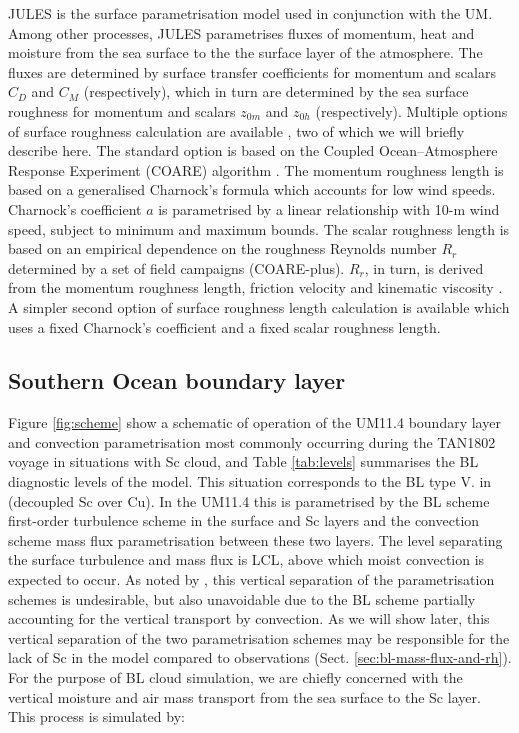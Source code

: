 JULES is the surface parametrisation model used in conjunction with the UM.
Among other processes, JULES parametrises fluxes of momentum, heat and moisture from
the sea surface to the the surface layer of the atmosphere. The fluxes are
determined by surface transfer coefficients for momentum and scalars $C_D$ and
$C_M$ (respectively), which in turn are determined by the sea surface roughness
for momentum and scalars $z_{0m}$ and $z_{0h}$ (respectively). Multiple options
of surface roughness calculation are available \citep{umdp024}, two of which we will briefly
describe here. The standard option is based on the
Coupled Ocean--Atmosphere Response Experiment (COARE) algorithm
\citep{fairall2003}. The momentum roughness length is based on
a generalised Charnock's formula which accounts for low wind speeds.
Charnock's coefficient $a$ is parametrised by a linear
relationship with 10-m wind speed, subject to minimum and maximum bounds.
The scalar roughness length is based on an empirical dependence on the
roughness Reynolds number $R_r$ determined by a set of field campaigns (COARE-plus).
$R_r$, in turn, is derived from the momentum roughness length, friction velocity
and kinematic viscosity \citep{fairall2003}.
A simpler second option of surface roughness length calculation is available
which uses a fixed Charnock's coefficient and a fixed scalar roughness length.


\subsection{Southern Ocean boundary layer}
\label{sec:schemes}

Figure \ref{fig:scheme} show a schematic of operation of the UM11.4 boundary layer and convection
parametrisation most
commonly occurring during the TAN1802 voyage in situations with Sc cloud,
and Table \ref{tab:levels} summarises the BL diagnostic levels of the model.
This situation corresponds to the BL type V. in \cite{lock2000} (decoupled Sc over Cu).
In the UM11.4 this is parametrised by the BL scheme first-order turbulence scheme
in the surface and Sc layers and the convection scheme mass flux parametrisation
between these two layers. The level separating the surface turbulence and
mass flux is LCL, above which moist convection is expected to occur.
As noted by \cite{lock2000}, this vertical separation of the parametrisation
schemes is undesirable, but also unavoidable due to the BL scheme partially
accounting for the vertical transport by convection. As we will show later,
this vertical separation of the two parametrisation schemes may be responsible for the
lack of Sc in the model compared to observations (Sect. \ref{sec:bl-mass-flux-and-rh}). For the purpose of BL
cloud simulation, we are chiefly concerned with the vertical moisture and air
mass transport from the sea surface to the Sc layer. This process is simulated
by:

